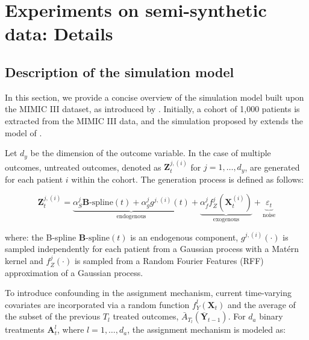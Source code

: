 \documentclass{article}
\theoremstyle{plain}
\theoremstyle{definition}
\theoremstyle{remark}
\begin{document}

\section{Experiments on semi-synthetic data: Details} 

\subsection{Description of the simulation model}
\label{subsect: details_sim_mimic}

In this section, we provide a concise overview of the simulation model built upon the MIMIC III dataset, as introduced by \cite{Melnychuk2022CausalTF}. Initially, a cohort of 1,000 patients is extracted from the MIMIC III data, and the simulation proposed by \cite{Melnychuk2022CausalTF} extends the model of \cite{schulam2017reliable}.

Let \( d_y \) be the dimension of the outcome variable. In the case of multiple outcomes, untreated outcomes, denoted as \( \mathbf{Z}_t^{j,(i)} \) for \( j=1, \ldots, d_y \), are generated for each patient \( i \) within the cohort. The generation process is defined as follows:

\begin{equation}
\mathbf{Z}_t^{j,(i)} = \underbrace{\alpha_S^j \mathbf{B}\text{-spline}(t) + \alpha_g^j g^{j,(i)}(t)}_{\text{endogenous}} + \underbrace{\alpha_f^j f_Z^j\left(\mathbf{X}_t^{(i)}\right)}_{\text{exogenous}} + \underbrace{\varepsilon_t}_{\text{noise}}
\end{equation}

where:
the B-spline \(\mathbf{B}\text{-spline}(t)\) is an endogenous component,
\( g^{j,(i)}(\cdot) \) is sampled independently for each patient from a Gaussian process with a Matérn kernel 
and \( f_Z^j(\cdot) \) is sampled from a Random Fourier Features (RFF) approximation of a Gaussian process. %

To introduce confounding in the assignment mechanism, current time-varying covariates are incorporated via a random function \( f_Y^l\left(\mathbf{X}_t\right) \) and the average of the subset of the previous \( T_l \) treated outcomes, \( \bar{A}_{T_l}\left(\overline{\mathbf{Y}}_{t-1}\right) \). For \( d_a \) binary treatments \( \mathbf{A}_t^l \), where \( l=1, \ldots, d_a \), the assignment mechanism is modeled as:
\end{document}
